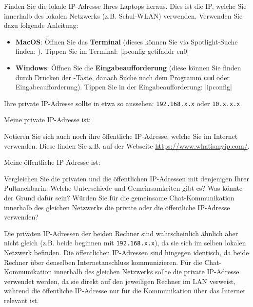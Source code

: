 \begin{myexercise}
    Finden Sie die lokale \gls{IP}-Adresse Ihres Laptops heraus. Dies ist die IP, welche Sie innerhalb des lokalen Netzwerks (z.B. Schul-WLAN) verwenden. Verwenden Sie dazu folgende Anleitung:
    \begin{itemize}
        \item[\faApple] \textbf{MacOS}: Öffnen Sie das \textbf{Terminal} (dieses können Sie via Spotlight-Suche finden: \keys{\cmd + \SPACE}). Tippen Sie im Terminal: \commandbox*|ipconfig getifaddr en0|
        \item[\faWindows] \textbf{Windows}: Öffnen Sie die \textbf{Eingabeaufforderung} (diese können Sie finden durch Drücken der \keys{\faWindows}-Taste, danach Suche nach dem Programm \texttt{cmd} oder Eingabeaufforderung). Tippen Sie in der Eingabeaufforderung: \commandbox*|ipconfig|
    \end{itemize}

    Ihre private \gls{IP}-Adresse sollte in etwa so aussehen: \texttt{192.168.x.x} oder \texttt{10.x.x.x}.

    Meine private \gls{IP}-Adresse ist: \ipPlaceHolder

    Notieren Sie sich auch noch ihre öffentliche \gls{IP}-Adresse, welche Sie im Internet verwenden. Diese finden Sie z.B. auf der Webseite \url{https://www.whatismyip.com/}.

    Meine öffentliche \gls{IP}-Adresse ist: \ipPlaceHolder
\end{myexercise}

\begin{myexercise}
    Vergleichen Sie die privaten und die öffentlichen \gls{IP}-Adressen mit denjenigen Ihrer Pultnachbarin. Welche Unterschiede und Gemeinsamkeiten gibt es? Was könnte der Grund dafür sein? Würden Sie für die gemeinsame Chat-Kommunikation innerhalb des gleichen Netzwerks die private oder die öffentliche \gls{IP}-Adresse verwenden?

    \begin{myanswer}
        Die privaten \gls{IP}-Adressen der beiden Rechner sind wahrscheinlich ähnlich aber nicht gleich (z.B. beide beginnen mit \texttt{192.168.x.x}), da sie sich im selben lokalen Netzwerk befinden. Die öffentlichen \gls{IP}-Adressen sind hingegen identisch, da beide Rechner über denselben Internetanschluss kommunizieren. Für die Chat-Kommunikation innerhalb des gleichen Netzwerks sollte die private \gls{IP}-Adresse verwendet werden, da sie direkt auf den jeweiligen Rechner im LAN verweist, während die öffentliche \gls{IP}-Adresse nur für die Kommunikation über das Internet relevant ist.
    \end{myanswer}
\end{myexercise}

